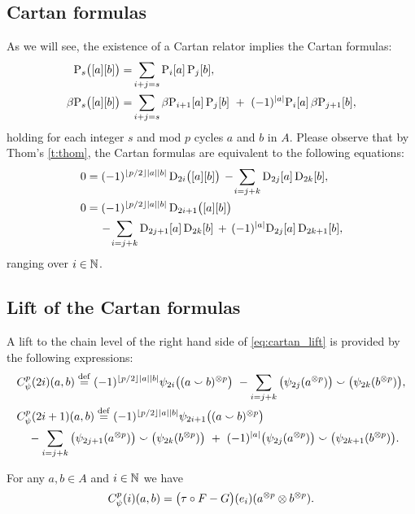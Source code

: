 \subsection{Cartan formulas}

As we will see, the existence of a Cartan relator implies the Cartan formulas:
\begin{align*}
	\mathrm{P}_s\big([a][b]\big) =&
	\sum_{i+j=s} \mathrm{P}_i[a] \, \mathrm{P}_j[b], \\
	\beta\mathrm{P}_s\big([a][b]\big) =&
	\sum_{i+j=s} \beta\mathrm{P}_{i+1}[a] \, \mathrm{P}_j[b] \ +\ (-1)^{\lvert a\rvert} \mathrm{P}_i[a] \, \beta\mathrm{P}_{j+1}[b],
\end{align*}
holding for each integer $s$ and mod $p$ cycles $a$ and $b$ in $A$.
Please observe that by Thom's \cref{t:thom}, the Cartan formulas are equivalent to the following equations:
\begin{equation}\label{eq:cartan_lift}
	\begin{split}
		0 &= (-1)^{\lfloor p/2\rfloor\lvert a\rvert\lvert b\rvert} \, \mathrm{D}_{2i}\big([a][b]\big) \,-\!
		\sum_{i=j+k} \mathrm{D}_{2j}[a] \, \mathrm{D}_{2k}[b], \\
		0 &= (-1)^{\lfloor p/2\rfloor\lvert a\rvert\lvert b\rvert} \, \mathrm{D}_{2i+1}\big([a][b]\big) \\ & \quad
		\,-\!\sum_{i=j+k} \mathrm{D}_{2j+1}[a] \, \mathrm{D}_{2k}[b] \, +\, (-1)^{\lvert a\rvert}\mathrm{D}_{2j}[a] \, \mathrm{D}_{2k+1}[b],
	\end{split}
\end{equation}
ranging over $i \in \mathbb{N}$.

\subsection{Lift of the Cartan formulas}

A lift to the chain level of the right hand side of \cref{eq:cartan_lift} is provided by the following expressions:
\begin{align*}
	&C_\psi^p(2i)(a,b) \stackrel{\mathrm{def}}{=} (-1)^{\lfloor p/2\rfloor\lvert a\rvert\lvert b\rvert} \psi_{2i}\big((a \smallsmile b)^{\otimes p}\big) \ -
	\sum_{i=j+k}\big(\psi_{2j}(a^{\otimes p})\big) \smallsmile \big(\psi_{2k}(b^{\otimes p})\big), \\
	&C_\psi^p(2i+1)(a,b) \stackrel{\mathrm{def}}{=} (-1)^{\lfloor p/2\rfloor\lvert a\rvert\lvert b\rvert} \psi_{2i+1}\big((a \smallsmile b)^{\otimes p}\big) \\
	&\quad -\sum_{i=j+k} \big(\psi_{2j+1}(a^{\otimes p})\big) \smallsmile \big(\psi_{2k}(b^{\otimes p})\big)\ +\
	(-1)^{\lvert a\rvert}\big(\psi_{2j}(a^{\otimes p})\big) \smallsmile \big(\psi_{2k+1}(b^{\otimes p})\big).
\end{align*}

\begin{lemma}
	For any $a,b \in A$ and $i \in \mathbb{N}$ we have
	\[
	C^p_\psi(i)(a,b) =
	\big(\tau \mathbin{\circ} F - G\big)(e_i)(a^{\otimes p} \otimes b^{\otimes p}).
	\]
\end{lemma}

